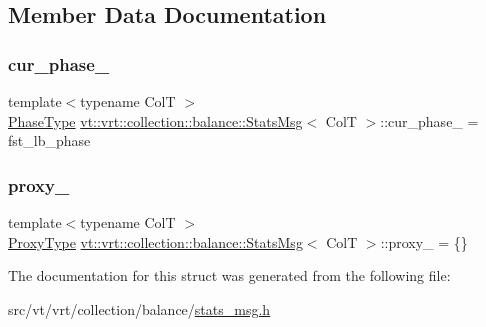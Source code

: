 \subsection{Member Data Documentation}
\mbox{\label{structvt_1_1vrt_1_1collection_1_1balance_1_1_stats_msg_a1d43d67f8161a18a2b0c146ddb777819}} 
\subsubsection{\texorpdfstring{cur\+\_\+phase\+\_\+}{cur\_phase\_}}
{\footnotesize\ttfamily template$<$typename ColT $>$ \\
\hyperlink{namespacevt_a46ce6733d5cdbd735d561b7b4029f6d7}{Phase\+Type} \hyperlink{structvt_1_1vrt_1_1collection_1_1balance_1_1_stats_msg}{vt\+::vrt\+::collection\+::balance\+::\+Stats\+Msg}$<$ ColT $>$\+::cur\+\_\+phase\+\_\+ = fst\+\_\+lb\+\_\+phase\hspace{0.3cm}{\ttfamily [private]}}

\mbox{\label{structvt_1_1vrt_1_1collection_1_1balance_1_1_stats_msg_a0f43e643f46ea5392037528870d11ae2}} 
\subsubsection{\texorpdfstring{proxy\+\_\+}{proxy\_}}
{\footnotesize\ttfamily template$<$typename ColT $>$ \\
\hyperlink{structvt_1_1vrt_1_1collection_1_1balance_1_1_stats_msg_a6f88a58947e0a02b3f7dcfec8b91b5fd}{Proxy\+Type} \hyperlink{structvt_1_1vrt_1_1collection_1_1balance_1_1_stats_msg}{vt\+::vrt\+::collection\+::balance\+::\+Stats\+Msg}$<$ ColT $>$\+::proxy\+\_\+ = \{\}\hspace{0.3cm}{\ttfamily [private]}}



The documentation for this struct was generated from the following file\+:\begin{DoxyCompactItemize}
\item 
src/vt/vrt/collection/balance/\hyperlink{stats__msg_8h}{stats\+\_\+msg.\+h}\end{DoxyCompactItemize}
